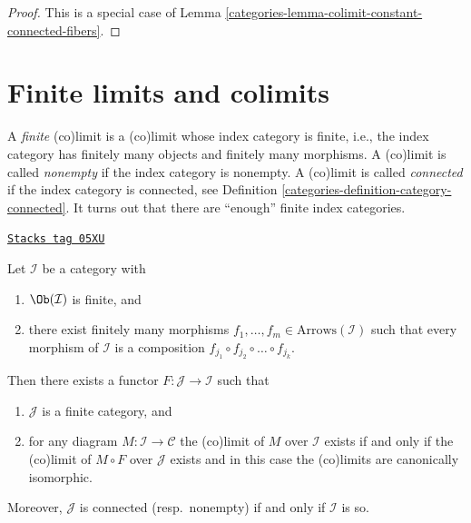 \begin{proof}

This is a special case of Lemma \ref{categories-lemma-colimit-constant-connected-fibers}.
\end{proof}

\section{Finite limits and colimits}
\label{categories-section-finite-limits}
A {\it finite} (co)limit is a (co)limit whose index category is finite,
i.e., the index category has finitely many objects and finitely many
morphisms. A (co)limit is called {\it nonempty} if the index category is
nonempty. A (co)limit is called {\it connected} if the index category is
connected, see
Definition \ref{categories-definition-category-connected}.
It turns out that there are ``enough'' finite index categories.

\begin{lemma}
\label{categories-lemma-finite-diagram-category}
\href{https://stacks.math.columbia.edu/tag/05XU}{\texttt{Stacks tag 05XU}}

Let $\mathcal{I}$ be a category with
\begin{enumerate}
\item $\Ob(\mathcal{I})$ is finite, and
\item there exist finitely many morphisms
$f_1, \ldots, f_m \in \text{Arrows}(\mathcal{I})$ such
that every morphism of $\mathcal{I}$ is a composition
$f_{j_1} \circ f_{j_2} \circ \ldots \circ f_{j_k}$.
\end{enumerate}
Then there exists a functor $F : \mathcal{J} \to \mathcal{I}$
such that
\begin{enumerate}
\item[(a)] $\mathcal{J}$ is a finite category, and
\item[(b)] for any diagram $M : \mathcal{I} \to \mathcal{C}$ the
(co)limit of $M$ over $\mathcal{I}$ exists if and only if
the (co)limit of $M \circ F$ over $\mathcal{J}$ exists and in this case
the (co)limits are canonically isomorphic.
\end{enumerate}
Moreover, $\mathcal{J}$ is connected (resp.\ nonempty) if and only if
$\mathcal{I}$ is so.
\end{lemma}

